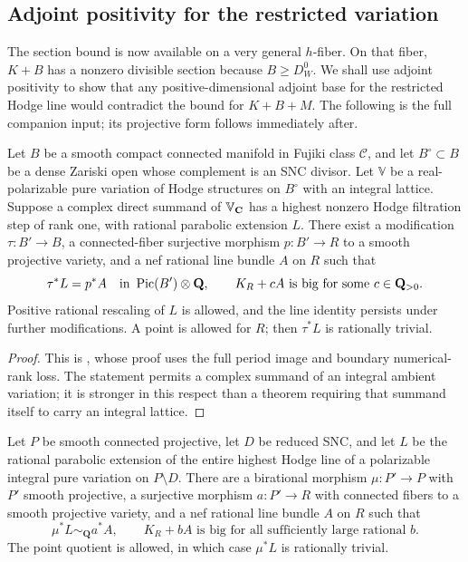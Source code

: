 \subsection{Adjoint positivity for the restricted variation}

The section bound is now available on a very general $h$-fiber.
On that fiber, $K+B$ has a nonzero divisible section because
$B\geq D_W^0$. We shall use adjoint positivity to show that any
positive-dimensional adjoint base for the restricted Hodge line
would contradict the bound for $K+B+M$. The following is the
full companion input; its projective form follows immediately after.

\begin{theorem}\label{period:adjoint}
Let $B$ be a smooth compact connected manifold in Fujiki class
$\mathcal C$, and let $B^\circ\subset B$ be a dense Zariski open
whose complement is an SNC divisor. Let $\mathbb V$ be a
real-polarizable pure variation of Hodge structures on $B^\circ$
with an integral lattice. Suppose a complex direct summand of
$\mathbb V_{\mathbf C}$ has a highest nonzero Hodge filtration step of rank
one, with rational parabolic extension $L$. There exist a modification
$\tau:B'\to B$, a connected-fiber surjective morphism $p:B'\to R$ to
a smooth projective variety, and a nef rational line bundle $A$ on
$R$ such that
\[
 \tau^*L=p^*A\quad\text{in }\operatorname{Pic}(B')\otimes\mathbf Q,
 \qquad K_R+cA\text{ is big for some }c\in\mathbf Q_{>0}.
\]
Positive rational rescaling of $L$ is allowed, and the line identity
persists under further modifications. A point is allowed for $R$;
then $\tau^*L$ is rationally trivial.
\end{theorem}

\begin{proof}
This is \cite[\PoneAdjoint]{SubadditivityCompanion},
whose proof uses the full period image and boundary numerical-rank
loss. The statement permits a complex summand of an integral ambient
variation; it is stronger in this respect than a theorem requiring
that summand itself to carry an integral lattice.
\end{proof}

\begin{proposition}\label{hd:adjoint}
Let $P$ be smooth connected projective, let $D$ be reduced SNC,
and let $L$ be the rational parabolic extension of the entire
highest Hodge line of a polarizable integral pure variation on
$P\setminus D$. There are a birational morphism
$\mu:P'\to P$ with $P'$ smooth projective, a surjective morphism
$a:P'\to R$ with connected fibers to a smooth projective variety,
and a nef rational line bundle $A$ on $R$ such that
\begin{equation}\label{hd:adjoint-conclusion}
 \mu^*L\sim_{\mathbf Q}a^*A,
 \qquad K_R+bA\text{ is big for all sufficiently large rational }b.
\end{equation}
The point quotient is allowed, in which case $\mu^*L$ is
rationally trivial.
\end{proposition}


